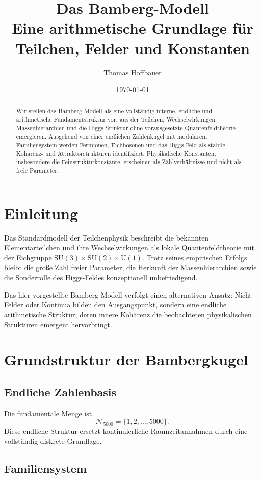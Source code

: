 \documentclass[11pt,a4paper]{article}
\title{\textbf{Das Bamberg-Modell}\\
Eine arithmetische Grundlage für Teilchen, Felder und Konstanten}
\author{Thomas Hoffbauer}
\date{\today}
\begin{document}
\maketitle

\begin{abstract}
Wir stellen das Bamberg-Modell als eine vollständig interne,
endliche und arithmetische Fundamentstruktur vor,
aus der Teilchen, Wechselwirkungen,
Massenhierarchien und die Higgs-Struktur
ohne vorausgesetzte Quantenfeldtheorie emergieren.
Ausgehend von einer endlichen Zahlenkugel
mit modularem Familiensystem
werden Fermionen, Eichbosonen und das Higgs-Feld
als stabile Kohärenz- und Attraktorstrukturen identifiziert.
Physikalische Konstanten, insbesondere die Feinstrukturkonstante,
erscheinen als Zählverhältnisse und nicht als freie Parameter.
\end{abstract}

\section{Einleitung}

Das Standardmodell der Teilchenphysik beschreibt
die bekannten Elementarteilchen und ihre Wechselwirkungen
als lokale Quantenfeldtheorie
mit der Eichgruppe
$\mathrm{SU}(3)\times\mathrm{SU}(2)\times\mathrm{U}(1)$.
Trotz seines empirischen Erfolgs
bleibt die große Zahl freier Parameter,
die Herkunft der Massenhierarchien
sowie die Sonderrolle des Higgs-Feldes
konzeptionell unbefriedigend.

Das hier vorgestellte Bamberg-Modell
verfolgt einen alternativen Ansatz:
Nicht Felder oder Kontinua bilden den Ausgangspunkt,
sondern eine endliche arithmetische Struktur,
deren innere Kohärenz
die beobachteten physikalischen Strukturen
emergent hervorbringt.

\section{Grundstruktur der Bambergkugel}

\subsection{Endliche Zahlenbasis}

Die fundamentale Menge ist
\[
\mathcal{N}_{5000} = \{1,2,\dots,5000\}.
\]
Diese endliche Struktur ersetzt
kontinuierliche Raumzeitannahmen
durch eine vollständig diskrete Grundlage.

\subsection{Familiensystem}
\end{document}
